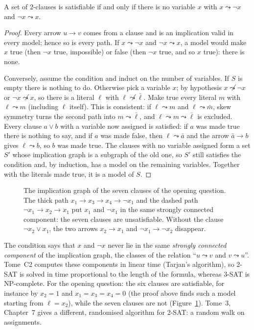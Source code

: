\begin{theorem}\label{thm:twosat}
A set of $2$-clauses is satisfiable if and only if there is no variable $x$ with $x\leadsto\neg x$ and $\neg x\leadsto x$.
\end{theorem}
\begin{proof}
Every arrow $u\to v$ comes from a clause and is an implication valid in every model; hence so is every path. If $x\leadsto\neg x$
and $\neg x\leadsto x$, a model would make $x$ true (then $\neg x$ true, impossible) or false (then $\neg x$ true, and so $x$ true): there is none.

Conversely, assume the condition and induct on the number of variables. If $S$ is empty there is nothing to do. Otherwise
pick a variable $x$; by hypothesis $x\not\leadsto\neg x$ or $\neg x\not\leadsto x$, so there is a literal $\ell$ with $\ell\not\leadsto\bar\ell$. Make true every literal $m$
with $\ell\leadsto m$ (including $\ell$ itself). This is consistent: if $\ell\leadsto m$ and $\ell\leadsto\bar m$, skew symmetry turns the second path into
$m\leadsto\bar\ell$, and $\ell\leadsto m\leadsto\bar\ell$ is excluded. Every clause $a\lor b$ with a variable now assigned is satisfied: if $a$ was made true
there is nothing to say, and if $a$ was made false, then $\ell\leadsto\bar a$ and the arrow $\bar a\to b$ gives $\ell\leadsto b$, so $b$ was made true. The
clauses with no variable assigned form a set $S'$ whose implication graph is a subgraph of the old one, so $S'$ still
satisfies the condition and, by induction, has a model on the remaining variables. Together with the literals made
true, it is a model of $S$.
\end{proof}

\begin{figure}[ht]
\centering
{}
\caption{The implication graph of the seven clauses of the opening question. The thick path $x_1\to x_3\to x_4\to\neg x_1$ and the
dashed path $\neg x_1\to x_2\to x_1$ put $x_1$ and $\neg x_1$ in the same strongly connected component: the seven clauses are
unsatisfiable. Without the clause $\neg x_2\lor x_1$, the two arrows $x_2\to x_1$ and $\neg x_1\to\neg x_2$ disappear.}
\label{fig:implication}
\end{figure}

The condition says that $x$ and $\neg x$ never lie in the same \emph{strongly connected component} of the implication graph, the
classes of the relation ``$u\leadsto v$ and $v\leadsto u$''. Tome~C2 computes these components in linear time (Tarjan's algorithm), so
2-SAT is solved in time proportional to the length of the formula, whereas 3-SAT is NP-complete. For the opening
question: the six clauses are satisfiable, for instance by $x_2=1$ and $x_1=x_3=x_4=0$ (the proof above finds such a model
starting from $\ell=x_2$), while the seven clauses are not (Figure~\ref{fig:implication}). Tome~3, Chapter~7 gives a
different, randomised algorithm for 2-SAT: a random walk on assignments.

